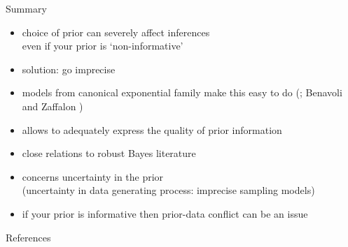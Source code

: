 \documentclass{beamer}
\begin{document}
\begin{frame}{Summary}
  \begin{itemize}%
  \item choice of prior can severely affect inferences \\
    even if your prior is `non-informative'
  \item solution: go imprecise %
  \item models from canonical exponential family make this easy to do
    {\footnotesize (\cite{2005:quaeghebeurcooman}; Benavoli and Zaffalon \cite*{2012:benavolizaffalon,2015:benavolizaffalon})}
  \item allows to adequately express the quality of prior information
  \item close relations to robust Bayes literature\\
    {\footnotesize \parencite{1994:berger,2000:rios}} %
  \item concerns uncertainty in the prior\\
    {\footnotesize (uncertainty in data generating process: imprecise sampling models)}
  \item if your prior is informative then prior-data conflict can be an issue
    {\footnotesize \parencite{2009:WalterAugustin,2013:diss-gw}}
  \end{itemize}
\end{frame}

\begin{frame}[allowframebreaks]{References}
%
%  
%   
\printbibliography[heading=none]
\end{frame}
\end{document}
